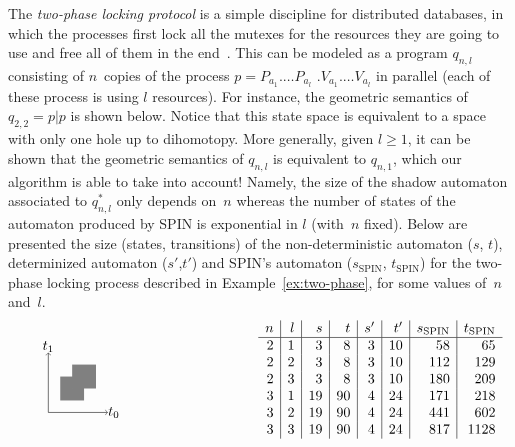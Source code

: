\documentclass[orivec]{llncs} \usepackage[T1]{fontenc}
\renewcommand{\P}[1]{P_{#1}}
\newcommand{\V}[1]{V_{#1}}
\renewcommand{\geq}{\geqslant}
\begin{document}
\begin{example}
  \label{ex:two-phase}
  The \emph{two-phase locking protocol} is a simple discipline for distributed
  databases, in which the processes first lock all the mutexes for the resources
  they are going to use and free all of them in the
  end~\cite{gunawardena1994homotopy}. This can be modeled as a program $q_{n,l}$
  consisting of $n$~copies of the process $p=\P {a_1}.\ldots\P{a_l}$
  $.\V{a_1}.\ldots\V{a_l}$ in parallel (each of these process is using $l$
  resources). For instance, the geometric semantics of $q_{2,2}=p|p$ is shown
  below. Notice that this state space is equivalent to a space with only one
  hole up to dihomotopy. More generally, given $l\geq 1$, it can be shown that
  the geometric semantics of $q_{n,l}$ is equivalent to $q_{n,1}$, which our
  algorithm is able to take into account! Namely, the size of the shadow
  automaton associated to $q_{n,l}^*$ only depends on~$n$ whereas the number of
  states of the automaton produced by SPIN is exponential in $l$ (with~$n$
  fixed). Below are presented the size (states, transitions) of the
  non-deterministic automaton ($s$, $t$), determinized automaton ($s'$,$t'$) and
  SPIN's automaton ($s_{\mathrm{SPIN}}$, $t_{\mathrm{SPIN}}$) for the two-phase
  locking process described in Example~\ref{ex:two-phase}, for some values
  of~$n$ and~$l$.
  \[
  \vcenter{
  \begin{tikzpicture}[scale=.3]
\fill[fill=gray] (1,1) -- (3,1) -- (3,3) -- (1,3) -- cycle;
    \fill[fill=gray] (2,2) -- (4,2) -- (4,4) -- (2,4) -- cycle;
\draw[->] (0,0) -- (5,0);
    \draw[->] (0,0) -- (0,5);
    \draw (5.5,0) node {$t_0$};
    \draw (0,5.5) node {$t_1$};
  \end{tikzpicture}}
  \hspace{-40ex}
  \begin{array}{r|r|r|r|r|r|r|r}
    n&l&s&t&s'&t'&s_{\mathrm{SPIN}}&t_{\mathrm{SPIN}}\\
    \hline{}
    2& 1& 3& 8& 3& 10&58&65\\
    2& 2& 3& 8& 3& 10&112&129\\
    2& 3& 3& 8& 3& 10&180&209\\
    3& 1& 19& 90& 4& 24&171&218\\
    3& 2& 19& 90& 4& 24&441&602\\
    3& 3& 19& 90& 4& 24&817&1128\\
  \end{array}
  \]
\end{example}
\end{document}
